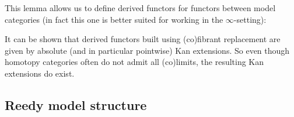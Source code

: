     This lemma allows us to define derived functors for functors between model categories (in fact this one is better suited for working in the $\infty$-setting):
    \begin{property}\label{model:absolute_derived_functors}
        It can be shown that derived functors built using (co)fibrant replacement are given by absolute (and in particular pointwise) Kan extensions. So even though homotopy categories often do not admit all (co)limits, the resulting Kan extensions do exist.
    \end{property}

\subsection{Reedy model structure}

